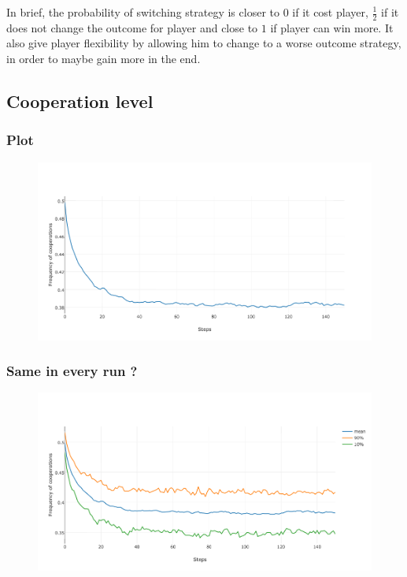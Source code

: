 \documentclass[11pt]{article}
\begin{document}
In brief, the probability of switching strategy is closer to 0 if it cost player, $\frac{1}{2}$ if it does not change the outcome for player and close to $1$ if player can win more. It also give player flexibility by allowing him to change to a worse outcome strategy, in order to maybe gain more in the end.

\subsection{Cooperation level}

\subsubsection{Plot}
 
\begin{figure}[H]
\centering
   \includegraphics[width=\textwidth]{img/part2/part2-moore-notmyself.png}
\end{figure}

\subsubsection{Same in every run ?}

\begin{figure}[H]
\centering
   \includegraphics[width=\textwidth]{img/part2/part2-moore-notmyself-std.png}
\end{figure}
\end{document}
